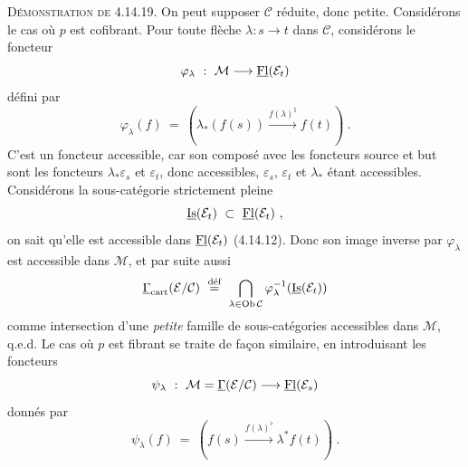 \textsc{Démonstration de} 4.14.19. On peut supposer $\mathcal{C}$ réduite, donc petite. Considérons le cas où $p$ est cofibrant. Pour toute flèche $\lambda : s \longrightarrow t$ dans $\mathcal{C}$, considérons le foncteur
\[
\varphi_\lambda \ : \ \mathcal{M} \longrightarrow \underline{\mathrm{Fl}}(\mathcal{E}_t)
\]
défini par
\[
\varphi_\lambda(f) \ = \ (\lambda_*(f(s)) \xrightarrow{f(\lambda)^\natural} f(t)) \ .
\]
C’est un foncteur accessible, car son composé avec les foncteurs source et but sont les foncteurs $\lambda_*\varepsilon_s$ et $\varepsilon_t$, donc accessibles, $\varepsilon_s$, $\varepsilon_t$ et $\lambda_*$ étant accessibles. Considérons la sous-catégorie strictement pleine
\[
\uIs(\mathcal{E}_t) \ \subset \ \uFl(\mathcal{E}_t) \ ,
\]
on sait qu’elle est accessible dans $\underline{\mathrm{Fl}}(\mathcal{E}_t)$ (4.14.12). Donc son image inverse par $\varphi_\lambda$ est accessible dans $\mathcal{M}$, et par suite aussi
\[
\uGamma_{\cart}(\mathcal{E}/\mathcal{C}) \ \overset{\text{déf}}{=} \ \bigcap_{\lambda\in\Ob\mathcal{C}} \varphi_\lambda^{-1}(\uIs(\mathcal{E}_t))
\]
comme intersection d’une \textit{petite} famille de sous-catégories accessibles dans $\mathcal{M}$, q.e.d. Le cas où $p$ est fibrant se traite de façon similaire, en introduisant les foncteurs
\[
\psi_\lambda \ : \ \mathcal{M} = \underline{\Gamma}(\mathcal{E}/\mathcal{C}) \longrightarrow \underline{\mathrm{Fl}}(\mathcal{E}_s)
\]
donnés par
\[
\psi_\lambda(f) \ = \ (f(s) \xrightarrow{f(\lambda)^\flat} \lambda^* f(t)) \ .
\]

